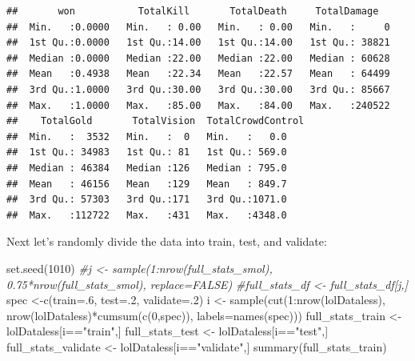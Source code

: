 \documentclass[
]{article}
\newenvironment{Shaded}{\begin{snugshade}}{\end{snugshade}}
\newcommand{\AttributeTok}[1]{\textcolor[rgb]{0.77,0.63,0.00}{#1}}
\newcommand{\CommentTok}[1]{\textcolor[rgb]{0.56,0.35,0.01}{\textit{#1}}}
\newcommand{\DecValTok}[1]{\textcolor[rgb]{0.00,0.00,0.81}{#1}}
\newcommand{\FunctionTok}[1]{\textcolor[rgb]{0.00,0.00,0.00}{#1}}
\newcommand{\NormalTok}[1]{#1}
\newcommand{\OtherTok}[1]{\textcolor[rgb]{0.56,0.35,0.01}{#1}}
\newcommand{\SpecialCharTok}[1]{\textcolor[rgb]{0.00,0.00,0.00}{#1}}
\newcommand{\StringTok}[1]{\textcolor[rgb]{0.31,0.60,0.02}{#1}}
\begin{document}
\begin{verbatim}
##       won           TotalKill       TotalDeath     TotalDamage    
##  Min.   :0.0000   Min.   : 0.00   Min.   : 0.00   Min.   :     0  
##  1st Qu.:0.0000   1st Qu.:14.00   1st Qu.:14.00   1st Qu.: 38821  
##  Median :0.0000   Median :22.00   Median :22.00   Median : 60628  
##  Mean   :0.4938   Mean   :22.34   Mean   :22.57   Mean   : 64499  
##  3rd Qu.:1.0000   3rd Qu.:30.00   3rd Qu.:30.00   3rd Qu.: 85667  
##  Max.   :1.0000   Max.   :85.00   Max.   :84.00   Max.   :240522  
##    TotalGold       TotalVision  TotalCrowdControl
##  Min.   :  3532   Min.   :  0   Min.   :   0.0   
##  1st Qu.: 34983   1st Qu.: 81   1st Qu.: 569.0   
##  Median : 46384   Median :126   Median : 795.0   
##  Mean   : 46156   Mean   :129   Mean   : 849.7   
##  3rd Qu.: 57303   3rd Qu.:171   3rd Qu.:1071.0   
##  Max.   :112722   Max.   :431   Max.   :4348.0
\end{verbatim}

Next let's randomly divide the data into train, test, and validate:

\begin{Shaded}
\begin{Highlighting}[]
\FunctionTok{set.seed}\NormalTok{(}\DecValTok{1010}\NormalTok{)}
\CommentTok{\#j \textless{}{-} sample(1:nrow(full\_stats\_smol), 0.75*nrow(full\_stats\_smol), replace=FALSE)}
\CommentTok{\#full\_stats\_df \textless{}{-} full\_stats\_df[j,]}
\NormalTok{spec }\OtherTok{\textless{}{-}}\FunctionTok{c}\NormalTok{(}\AttributeTok{train=}\NormalTok{.}\DecValTok{6}\NormalTok{, }\AttributeTok{test=}\NormalTok{.}\DecValTok{2}\NormalTok{, }\AttributeTok{validate=}\NormalTok{.}\DecValTok{2}\NormalTok{)}
\NormalTok{i }\OtherTok{\textless{}{-}} \FunctionTok{sample}\NormalTok{(}\FunctionTok{cut}\NormalTok{(}\DecValTok{1}\SpecialCharTok{:}\FunctionTok{nrow}\NormalTok{(lolDataless), }\FunctionTok{nrow}\NormalTok{(lolDataless)}\SpecialCharTok{*}\FunctionTok{cumsum}\NormalTok{(}\FunctionTok{c}\NormalTok{(}\DecValTok{0}\NormalTok{,spec)), }\AttributeTok{labels=}\FunctionTok{names}\NormalTok{(spec)))}
\NormalTok{full\_stats\_train }\OtherTok{\textless{}{-}}\NormalTok{ lolDataless[i}\SpecialCharTok{==}\StringTok{"train"}\NormalTok{,]}
\NormalTok{full\_stats\_test }\OtherTok{\textless{}{-}}\NormalTok{ lolDataless[i}\SpecialCharTok{==}\StringTok{"test"}\NormalTok{,]}
\NormalTok{full\_stats\_validate }\OtherTok{\textless{}{-}}\NormalTok{ lolDataless[i}\SpecialCharTok{==}\StringTok{"validate"}\NormalTok{,]}
\FunctionTok{summary}\NormalTok{(full\_stats\_train)}
\end{Highlighting}
\end{Shaded}
\end{document}
